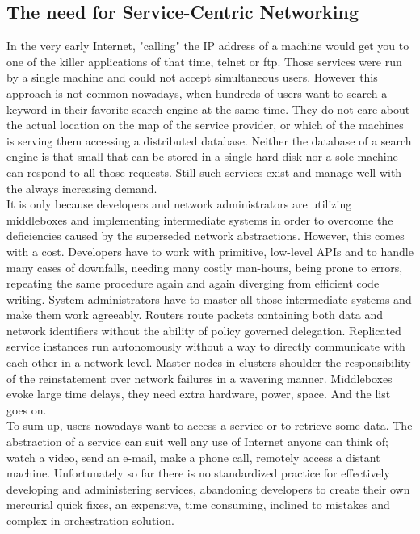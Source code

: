 \documentclass[12pt,a4paper,oneside]{article}
\begin{document}
\newpage
\subsection{The need for Service-Centric Networking}
In the very early Internet, "calling" the IP address of a machine would get you to one of the killer applications of that time, telnet or ftp.
Those services were run by a single machine and could not accept simultaneous users.
However this approach is not common nowadays, when hundreds of users want to search a keyword in their favorite search engine at the same time.
They do not care about the actual location on the map of the service provider, or which of the machines is serving them accessing a distributed database.
Neither the database of a search engine is that small that can be stored in a single hard disk nor a sole machine can respond to all those requests.
Still such services exist and manage well with the always increasing demand. \\
\indent It is only because developers and network administrators are utilizing middleboxes and implementing intermediate systems in order to overcome the deficiencies caused by the superseded network abstractions.
However, this comes with a cost.
Developers have to work with primitive, low-level APIs and to handle many cases of downfalls, needing many costly man-hours, being prone to errors, repeating the same procedure again and again diverging from efficient code writing.
System administrators have to master all those intermediate systems and make them work agreeably.
Routers route packets containing both data and network identifiers without the ability of policy governed delegation.
Replicated service instances run autonomously without a way to directly communicate with each other in a network level.
Master nodes in clusters shoulder the responsibility of the reinstatement over network failures in a wavering manner.
Middleboxes evoke large time delays, they need extra hardware, power, space.
And the list goes on.\\
\indent To sum up, users nowadays want to access a service or to retrieve some data.
The abstraction of a service can suit well any use of Internet anyone can think of; watch a video, send an e-mail, make a phone call, remotely access a distant machine. Unfortunately so far there is no standardized practice for effectively developing and administering services, abandoning developers to create their own mercurial quick fixes, an expensive, time consuming, inclined to mistakes and complex in orchestration solution.
\end{document}
